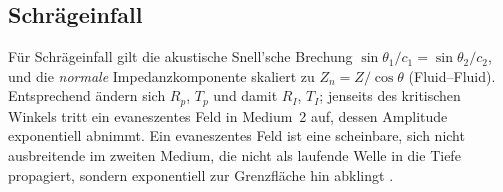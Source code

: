 \subsection{Schräg\-einfall}
Für Schräg\-einfall gilt die akustische Snell'sche Brechung
\(
    \sin\theta_1/c_1=\sin\theta_2/c_2
\),
und die \emph{normale} Impedanzkomponente skaliert zu
$Z_{n} = Z/\cos\theta$ (Fluid--Fluid).
Entsprechend ändern sich $R_p$, $T_p$ und damit $R_I$, $T_I$;
jenseits des kritischen Winkels tritt ein evaneszentes Feld in
Medium~2 auf, dessen Amplitude exponentiell abnimmt.
Ein evaneszentes Feld ist eine scheinbare, sich nicht ausbreitende
im zweiten Medium, die nicht als laufende Welle in die Tiefe propagiert,
sondern exponentiell zur Grenzfläche hin abklingt \cite{schall:wikiSnell}.
